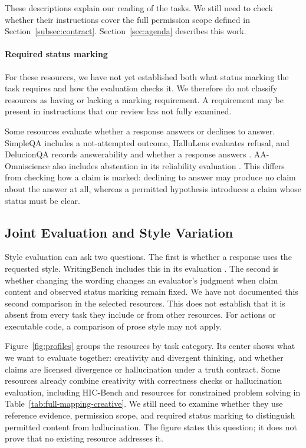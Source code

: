 These descriptions explain our reading of the tasks. We still need to check
whether their instructions cover the full permission scope defined in
Section~\ref{subsec:contract}. Section~\ref{sec:agenda} describes this work.

\paragraph{Required status marking}
For these resources, we have not yet established both what status marking
the task requires and how the evaluation checks it. We therefore do not
classify resources as having or lacking a marking requirement. A requirement
may be present in instructions that our review has not fully examined.

Some resources evaluate whether a response answers or declines to answer.
SimpleQA includes a not-attempted outcome, HalluLens evaluates refusal, and
DelucionQA records answerability and whether a response answers
\citep{wei_measuring_2024,bang_hallulens_2025,sadat_delucionqa_2023}.
AA-Omniscience also includes abstention in its reliability evaluation
\citep{jackson_aaomniscience_2025}. This differs from checking how a claim
is marked: declining to answer may produce no claim about the answer at all,
whereas a permitted hypothesis introduces a claim whose status must be clear.

\subsection{Joint Evaluation and Style Variation}

Style evaluation can ask two questions. The first is whether a response
uses the requested style. WritingBench includes this in its evaluation
\citep{wu_writingbench_2025}. The second is whether changing the wording
changes an evaluator's judgment when claim content and observed status
marking remain fixed. We have not documented this second comparison in the
selected resources. This does not establish that it is absent from every
task they include or from other resources. For actions or executable code,
a comparison of prose style may not apply.

Figure~\ref{fig:profiles} groups the resources by task category. Its center
shows what we want to evaluate together: creativity and divergent thinking,
and whether claims are licensed divergence or hallucination under a truth
contract. Some resources already combine creativity with correctness checks
or hallucination evaluation, including HIC-Bench and resources for
constrained problem solving in Table~\ref{tab:full-mapping-creative}.
We still need to examine whether they use reference evidence, permission
scope, and required status marking to distinguish permitted content from
hallucination. The figure states this question; it does not prove that no
existing resource addresses it.

